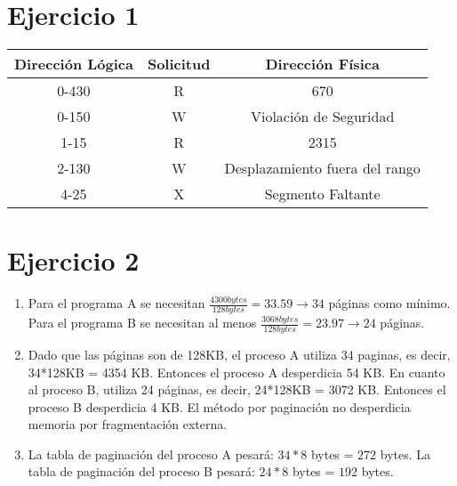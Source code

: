 \documentclass[12pt]{article}
\begin{document}
	\section*{Ejercicio 1}
	\begin{Large}
	\begin{center}
		\begin{tabular}{ c | c | c }
			\textbf{Dirección Lógica} & \textbf{Solicitud} & \textbf{Dirección Física} \\ \hline
			0-430 & R & 670 \\ 
			0-150 & W & Violación de Seguridad \\
			1-15 & R & 2315 \\
			2-130 & W & Desplazamiento fuera del rango \\
			4-25 & X & Segmento Faltante \\
		\end{tabular}
	\end{center}
	\end{Large}
	\section*{Ejercicio 2}
	\begin{enumerate}[label=\alph*)]
		\item Para el programa A se necesitan $\frac{4300 bytes}{128 bytes} = 33.59 \rightarrow 34$ páginas como mínimo. Para el programa B se necesitan al menos $\frac{3068 bytes}{128 bytes} = 23.97 \rightarrow 24$ páginas.
		\item Dado que las páginas son de 128KB, el proceso A utiliza 34 paginas, es decir, 34*128KB = 4354 KB. Entonces el proceso A desperdicia 54 KB. En cuanto al proceso B, utiliza 24 páginas, es decir, 24*128KB = 3072 KB. Entonces el proceso B desperdicia 4 KB. El método por paginación no desperdicia memoria por fragmentación externa.
		\item La tabla de paginación del proceso A pesará: $34 * 8$ bytes = $272$ bytes. La tabla de paginación del proceso B pesará: $24 * 8$ bytes = $192$ bytes.
	\end{enumerate}
\end{document}
